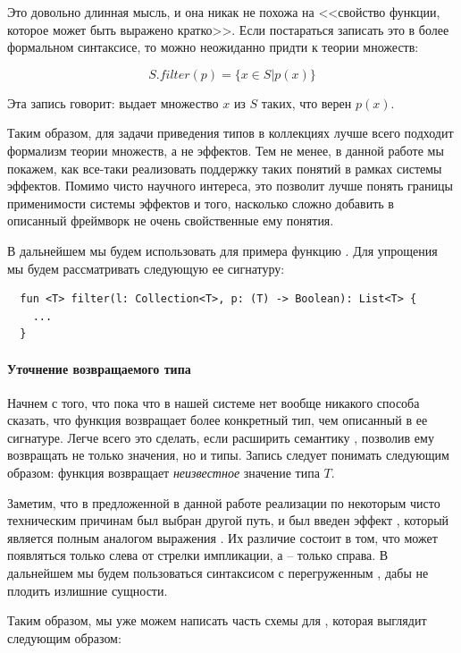 Это довольно длинная мысль, и она никак не похожа на <<свойство функции, которое может быть выражено кратко>>. Если постараться записать это в более формальном синтаксисе, то можно неожиданно придти к теории множеств:

$$ S.filter(p) = \{ x \in S | p(x) \} $$

Эта запись говорит:  выдает множество $x$ из $S$ таких, что верен $p(x)$.

Таким образом, для задачи приведения типов в коллекциях лучше всего подходит формализм теории множеств, а не эффектов. Тем не менее, в данной работе мы покажем, как все-таки реализовать поддержку таких понятий в рамках системы эффектов. Помимо чисто научного интереса, это позволит лучше понять границы применимости системы эффектов и того, насколько сложно добавить в описанный фреймворк не очень свойственные ему понятия.

В дальнейшем мы будем использовать для примера функцию . Для упрощения мы будем рассматривать следующую ее сигнатуру:

\begin{verbatim}
  fun <T> filter(l: Collection<T>, p: (T) -> Boolean): List<T> {
    ...
  }
\end{verbatim}

\paragraph{Уточнение возвращаемого типа}

Начнем с того, что пока что в нашей системе нет вообще никакого способа сказать, что функция возвращает более конкретный тип, чем описанный в ее сигнатуре. Легче всего это сделать, если расширить семантику , позволив ему возвращать не только значения, но и типы. Запись  следует понимать следующим образом: функция возвращает \emph{неизвестное} значение типа $T$.

Заметим, что в предложенной в данной работе реализации по некоторым чисто техническим причинам был выбран другой путь, и был введен эффект , который является полным аналогом выражения . Их различие состоит в том, что  может появляться только слева от стрелки импликации, а  -- только справа. В дальнейшем мы будем пользоваться синтаксисом с перегруженным , дабы не плодить излишние сущности.

Таким образом, мы уже можем написать часть схемы для , которая выглядит следующим образом:

